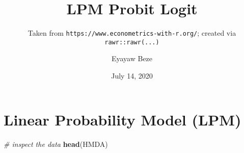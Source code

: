 \documentclass[
]{article}
\title{LPM Probit Logit}
\subtitle{Taken from \texttt{https://www.econometrics-with-r.org/};
created via \texttt{rawr::rawr(...)}}
\author{Eyayaw Beze}
\date{July 14, 2020}
\newenvironment{Shaded}{\begin{snugshade}}{\end{snugshade}}
\newcommand{\CommentTok}[1]{\textcolor[rgb]{0.56,0.35,0.01}{\textit{#1}}}
\newcommand{\KeywordTok}[1]{\textcolor[rgb]{0.13,0.29,0.53}{\textbf{#1}}}
\newcommand{\NormalTok}[1]{#1}
\begin{document}
\maketitle

\hypertarget{linear-probability-model-lpm}{%
\section{Linear Probability Model
(LPM)}\label{linear-probability-model-lpm}}

\begin{Shaded}
\begin{Highlighting}[]
\CommentTok{\# inspect the data}
\KeywordTok{head}\NormalTok{(HMDA)}
\end{Highlighting}
\end{Shaded}
\end{document}
